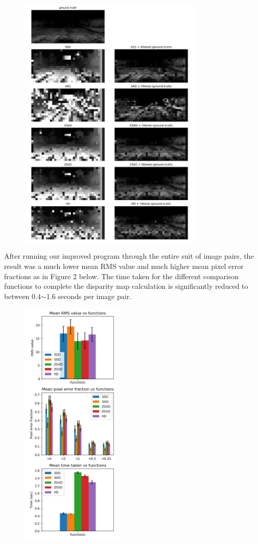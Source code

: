 \documentclass[conference]{IEEEtran}
\begin{document}
\begin{figure}[H]
    \centering
    \includegraphics[width=8.8cm]{702_output_25_50.png}
\end{figure}

After running our improved program through the entire suit of image pairs, the result was a much lower mean RMS value and much higher mean pixel error fractions as in Figure 2 below. 
The time taken for the different comparison functions to complete the
disparity map calculation is significantly reduced to between 0.4\(\sim\)1.6 seconds per image pair.

\begin{figure}[H]
    \centering
    \includegraphics[height=12cm]{stats_25_50.png}
\end{figure}
\end{document}
